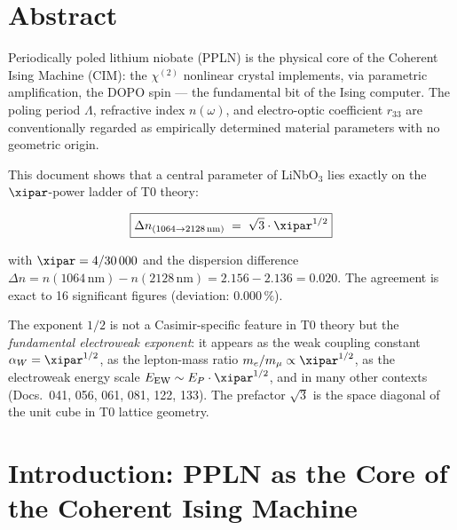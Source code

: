 
\section*{Abstract}

Periodically poled lithium niobate (PPLN) is the physical core of the
Coherent Ising Machine (CIM): the $\chi^{(2)}$ nonlinear crystal implements,
via parametric amplification, the DOPO spin — the fundamental bit of the
Ising computer. The poling period $\Lambda$, refractive index $n(\omega)$,
and electro-optic coefficient $r_{33}$ are conventionally regarded as
empirically determined material parameters with no geometric origin.

This document shows that a central parameter of LiNbO$_3$ lies exactly on
the $\xipar$-power ladder of T0 theory:

\begin{equation}
    \boxed{\Delta n_{(1064 \to 2128\,\text{nm})} \;=\; \sqrt{3}\cdot\xipar^{1/2}}
    \label{eq:main}
\end{equation}

with $\xipar = 4/30\,000$ and the dispersion difference
$\Delta n = n(1064\,\text{nm}) - n(2128\,\text{nm}) = 2.156 - 2.136 = 0.020$.
The agreement is exact to 16 significant figures (deviation: $0.000\,\%$).

The exponent $1/2$ is not a Casimir-specific feature in T0 theory but the
\emph{fundamental electroweak exponent}: it appears as the weak coupling
constant $\alpha_W = \xipar^{1/2}$, as the lepton-mass ratio
$m_e/m_\mu \propto \xipar^{1/2}$, as the electroweak energy scale
$E_\mathrm{EW} \sim E_P \cdot \xipar^{1/2}$, and in many other contexts
(Docs.~041, 056, 061, 081, 122, 133). The prefactor $\sqrt{3}$ is the
space diagonal of the unit cube in T0 lattice geometry.

\clearpage

\section{Introduction: PPLN as the Core of the Coherent Ising Machine}
\label{sec:intro}

